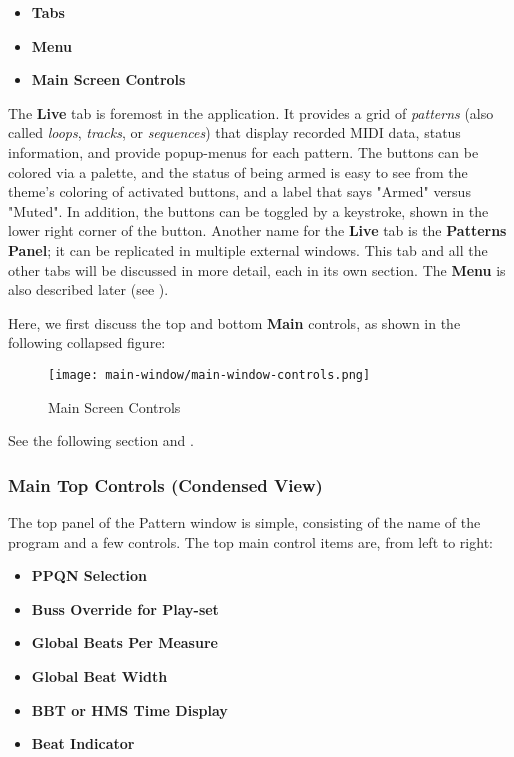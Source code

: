 \documentclass[
 11pt,
 twoside,
 a4paper,
 final                                 %
]{article}
\begin{document}
   \begin{itemize}
      \item \textbf{Tabs}
      \item \textbf{Menu}
      \item \textbf{Main Screen Controls}
   \end{itemize}

   The \textbf{Live} tab is foremost in the application.
   It provides a grid of \textsl{patterns}
   (also called \textsl{loops}, \textsl{tracks}, or
   \textsl{sequences}) that display recorded MIDI data, status information, and
   provide popup-menus for each pattern.
   The buttons can
   be colored via a palette, and the status of being armed is easy to see
   from the theme's coloring of activated buttons, and a label that says "Armed"
   versus "Muted".
   In addition, the buttons can be toggled by a keystroke, shown in the lower
   right corner of the button.
   Another name for the \textbf{Live} tab is the \textbf{Patterns Panel};
   it can be replicated in multiple external windows.
   This tab and all the other tabs
   will be discussed in more detail, each in its own section.
   The \textbf{Menu} is also described later (see ).

   Here, we first discuss the top and bottom \textbf{Main} controls, as
   shown in the following collapsed figure:

\begin{figure}[H]
   \centering 
   \texttt{[image: main-window/main-window-controls.png]}
   \caption{Main Screen Controls}
   \label{fig:main_screen_controls}
\end{figure}

   See the following section and
   .

\subsubsection{Main Top Controls (Condensed View)}
\label{subsubsec:introduction_main_top_controls}

   The top panel of the Pattern window is simple, consisting of the
   name of the program and a few controls.
   The top main control items are, from left to right:

   \begin{itemize}
      \item \textbf{PPQN Selection}
      \item \textbf{Buss Override for Play-set}
      \item \textbf{Global Beats Per Measure}
      \item \textbf{Global Beat Width}
      \item \textbf{BBT or HMS Time Display}
      \item \textbf{Beat Indicator}
   \end{itemize}
\end{document}
